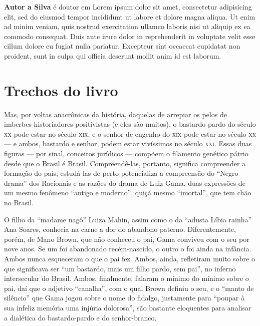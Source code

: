 \documentclass[11pt,a4paper]{article}
\begin{document}
\small
\textbf{Autor a Silva} é doutor em Lorem ipsum dolor sit amet, consectetur
 adipisicing elit, sed do eiusmod tempor incididunt ut labore et dolore magna
 aliqua. Ut enim ad minim veniam, quis nostrud exercitation ullamco laboris
 nisi ut aliquip ex ea commodo consequat. Duis aute irure dolor in
 reprehenderit in voluptate velit esse cillum dolore eu fugiat nulla
 pariatur. Excepteur sint occaecat cupidatat non proident, sunt in culpa qui
 officia deserunt mollit anim id est laborum.

\pagebreak

\section{Trechos do livro}

\begin{multicols}{2}

Mas, por voltas anacrônicas da história, daquelas de arrepiar os pelos de
imberbes historiadores positivistas (e eles são muitos), o bastardo pardo do
século \textsc{xx} pode estar no século \textsc{xix}, e o senhor de engenho do \textsc{xix} pode estar
no século \textsc{xx} — e ambos, bastardo e senhor, podem estar vivíssimos no século
\textsc{xxi}. Essas duas figuras — por sinal, conceitos jurídicos — compõem o
filamento genético pátrio desde que o Brasil é Brasil. Compreendê-las,
portanto, significa compreender a formação do país; estudá-las de perto
potencializa a compreensão do ``Negro drama'' dos Racionais e as razões do
drama de Luiz Gama, duas expressões de um mesmo fenômeno ``antigo e moderno'',
quiçá mesmo ``imortal'', que tem chão no Brasil. 

O filho da ``madame nagô'' Luiza Mahin, assim como o da ``adusta Líbia rainha''
Ana Soares, conhecia na carne a dor do abandono paterno. Diferentemente,
porém, de Mano Brown, que não conheceu o pai, Gama conviveu com o seu por
nove anos. Se um foi abandonado recém-nascido, o outro o foi ainda na
infância. Ambos nunca esqueceram o que o pai fez. Ambos, ainda, refletiram
muito sobre o que significava ser ``um bastardo, mais um filho pardo, sem
pai'', no inferno intersecular do Brasil. Ambos, finalmente, falaram o mínimo
do mínimo sobre o pai, daí que o adjetivo ``canalha'', com o qual Brown definiu
o seu, e o ``manto de silêncio'' que Gama jogou sobre o nome do fidalgo,
justamente para ``poupar à sua infeliz memória uma injúria dolorosa'', são
bastante eloquentes para analisar a dialética do bastardo-pardo e do
senhor-branco.
\end{multicols}
\end{document}
